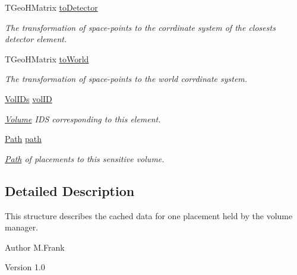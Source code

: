 \begin{DoxyCompactItemize}
TGeoHMatrix \hyperlink{class_d_d4hep_1_1_geometry_1_1_volume_manager_context_a0978a0bffd0e0669f14d0ddea43ea6bb}{toDetector}
\begin{DoxyCompactList}\small\item\em The transformation of space-\/points to the corrdinate system of the closests detector element. \item\end{DoxyCompactList}\item 
TGeoHMatrix \hyperlink{class_d_d4hep_1_1_geometry_1_1_volume_manager_context_a724f7f6ffc6fc9e91dca0f07d5f14d1d}{toWorld}
\begin{DoxyCompactList}\small\item\em The transformation of space-\/points to the world corrdinate system. \item\end{DoxyCompactList}\item 
\hyperlink{class_d_d4hep_1_1_geometry_1_1_volume_manager_context_aedf28d4a226428cfc6ebaabaee0b4c9e}{VolIDs} \hyperlink{class_d_d4hep_1_1_geometry_1_1_volume_manager_context_a3982d4e94fc483caa54382e719eb568c}{volID}
\begin{DoxyCompactList}\small\item\em \hyperlink{class_d_d4hep_1_1_geometry_1_1_volume}{Volume} IDS corresponding to this element. \item\end{DoxyCompactList}\item 
\hyperlink{class_d_d4hep_1_1_path}{Path} \hyperlink{class_d_d4hep_1_1_geometry_1_1_volume_manager_context_aa29bc3744ae4aff1e6a504c2b758a37c}{path}
\begin{DoxyCompactList}\small\item\em \hyperlink{class_d_d4hep_1_1_path}{Path} of placements to this sensitive volume. \item\end{DoxyCompactList}\end{DoxyCompactItemize}


\subsection{Detailed Description}
This structure describes the cached data for one placement held by the volume manager. \begin{DoxyAuthor}{Author}
M.Frank 
\end{DoxyAuthor}
\begin{DoxyVersion}{Version}
1.0 
\end{DoxyVersion}


